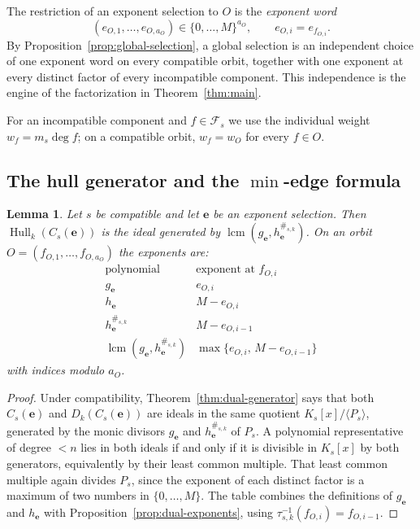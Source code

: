 \documentclass[11pt,a4paper]{article}
\newcommand{\Fs}{\mathcal F_s}
\newcommand{\Hull}{\operatorname{Hull}}
\newcommand{\Dk}{D_k}
\newcommand{\lcm}{\operatorname{lcm}}
\numberwithin{equation}{section}
\theoremstyle{plain}
\newtheorem{lemma}[theorem]{Lemma}
\theoremstyle{definition}
\theoremstyle{remark}
\begin{document}
The restriction of an exponent selection to $O$ is the \emph{exponent word}
\[
(e_{O,1},\ldots,e_{O,a_O})\in\{0,\ldots,M\}^{a_O},
\qquad e_{O,i}=e_{f_{O,i}} .
\]
By Proposition~\ref{prop:global-selection}, a global selection is an
independent choice of one exponent word on every compatible orbit, together
with one exponent at every distinct factor of every incompatible component.
This independence is the engine of the factorization in
Theorem~\ref{thm:main}.

For an incompatible component and $f\in\Fs$ we use the individual weight
$w_f=m_s\deg f$; on a compatible orbit, $w_f=w_O$ for every $f\in O$.

\subsection{The hull generator and the \texorpdfstring{$\min$}{min}-edge
formula}\label{sec:min-edge}

\begin{lemma}\label{lem:hull-generator}
Let $s$ be compatible and let $\mathbf{e}$ be an exponent selection.  Then
$\Hull_k(C_s(\mathbf{e}))$ is the ideal generated by
$\lcm(g_{\mathbf{e}},h_{\mathbf{e}}^{\#_{s,k}})$.  On an orbit
$O=(f_{O,1},\ldots,f_{O,a_O})$ the exponents are:
\[
\begin{array}{c|c}
\text{polynomial} & \text{exponent at }f_{O,i}\\ \hline
 g_{\mathbf{e}} & e_{O,i}\\
 h_{\mathbf{e}} & M-e_{O,i}\\
 h_{\mathbf{e}}^{\#_{s,k}} & M-e_{O,i-1}\\
 \lcm(g_{\mathbf{e}},h_{\mathbf{e}}^{\#_{s,k}}) &
   \max\{e_{O,i},\,M-e_{O,i-1}\}
\end{array}
\]
with indices modulo $a_O$.
\end{lemma}

\begin{proof}
Under compatibility, Theorem~\ref{thm:dual-generator} says that both
$C_s(\mathbf{e})$ and $\Dk(C_s(\mathbf{e}))$ are ideals in the same quotient
$K_s[x]/\langle P_s\rangle$, generated by the monic divisors
$g_{\mathbf{e}}$ and $h_{\mathbf{e}}^{\#_{s,k}}$ of $P_s$.  A polynomial
representative of degree $<n$ lies in both ideals if and only if it is
divisible in $K_s[x]$ by both generators, equivalently by their least common
multiple.  That least common multiple again divides $P_s$, since the exponent
of each distinct factor is a maximum of two numbers in $\{0,\ldots,M\}$.  The
table combines the definitions of $g_{\mathbf{e}}$ and $h_{\mathbf{e}}$ with
Proposition~\ref{prop:dual-exponents}, using
$\tau_{s,k}^{-1}(f_{O,i})=f_{O,i-1}$.
\end{proof}
\end{document}
